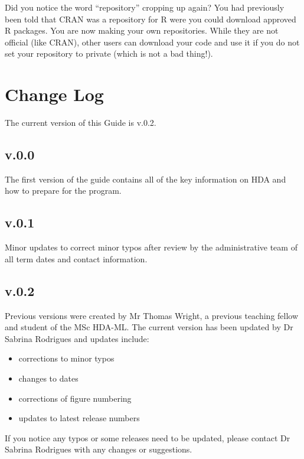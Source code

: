 \documentclass[
]{book}
\providecommand{\tightlist}{%
  \setlength{\itemsep}{0pt}\setlength{\parskip}{0pt}}
\begin{document}
Did you notice the word ``repository'' cropping up again? You had previously been told that CRAN was a repository for R were you could download approved R packages. You are now making your own repositories. While they are not official (like CRAN), other users can download your code and use it if you do not set your repository to private (which is not a bad thing!).

\chapter{Change Log}\label{change-log}

The current version of this Guide is v.0.2.

\section*{v.0.0}\label{v.0.0}

The first version of the guide contains all of the key information on HDA and how to prepare for the program.

\section*{v.0.1}\label{v.0.1}

Minor updates to correct minor typos after review by the administrative team of all term dates and contact information.

\section*{v.0.2}\label{v.0.2}

Previous versions were created by Mr Thomas Wright, a previous teaching fellow and student of the MSc HDA-ML. The current version has been updated by Dr Sabrina Rodrigues and updates include:

\begin{itemize}
\tightlist
\item
  corrections to minor typos
\item
  changes to dates
\item
  corrections of figure numbering
\item
  updates to latest release numbers
\end{itemize}

If you notice any typos or some releases need to be updated, please contact Dr Sabrina Rodrigues with any changes or suggestions.
\end{document}
